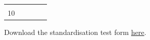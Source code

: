 \documentclass[12pt,]{book}
\theoremstyle{definition}
\theoremstyle{definition}
\theoremstyle{definition}
\theoremstyle{remark}
\let\BeginKnitrBlock\begin \let\EndKnitrBlock\end
\begin{document}
\begin{longtable}[]{@{}lllll@{}}
\begin{minipage}[t]{0.17\columnwidth}
\strut
\end{minipage}\tabularnewline
\begin{minipage}[t]{0.17\columnwidth}\raggedright
10\strut
\end{minipage} & \begin{minipage}[t]{0.17\columnwidth}\raggedright
\strut
\end{minipage} & \begin{minipage}[t]{0.17\columnwidth}\raggedright
\strut
\end{minipage} & \begin{minipage}[t]{0.17\columnwidth}\raggedright
\strut
\end{minipage} & \begin{minipage}[t]{0.17\columnwidth}\raggedright
\strut
\end{minipage}\tabularnewline
\bottomrule
\end{longtable}

\BeginKnitrBlock{rmddownload}
Download the standardisation test form
\href{pdf/standardForm.pdf}{here}.
\EndKnitrBlock{rmddownload}
\end{document}
